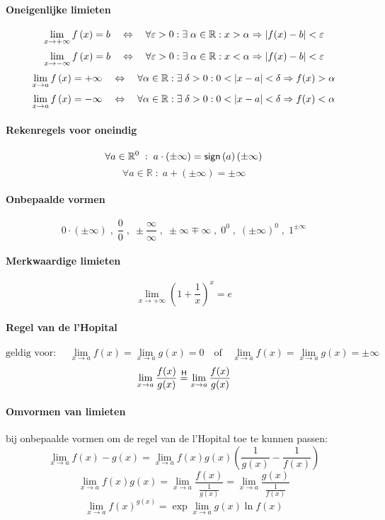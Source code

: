 \paragraph{Oneigenlijke limieten}
\[
  \lim_{x \to + \infty} f\left(x\right) = b 
  \quad \Leftrightarrow \quad
  \forall \varepsilon > 0 : \exists\; \alpha \in \mathbb{R} : x > \alpha
                            \Rightarrow \abs{f(x) - b} < \varepsilon
\]
\[
  \lim_{x \to - \infty} f\left(x\right) = b 
  \quad \Leftrightarrow \quad
  \forall \varepsilon > 0 : \exists\; \alpha \in \mathbb{R} : x < \alpha
                            \Rightarrow \abs{f(x) - b} < \varepsilon
\]
\[
  \lim_{x \to a} f\left(x\right) = + \infty 
  \quad \Leftrightarrow \quad
  \forall \alpha \in \mathbb{R} : \exists\; \delta > 0 : 0 < \abs{x-a} < \delta
                                  \Rightarrow f(x) > \alpha
\]
\[
  \lim_{x \to a} f\left(x\right) = - \infty 
  \quad \Leftrightarrow \quad
  \forall \alpha \in \mathbb{R} : \exists\; \delta > 0 : 0 < \abs{x-a} < \delta
                                  \Rightarrow f(x) < \alpha
\]
\paragraph{Rekenregels voor oneindig}
\[
  \forall a \in \mathbb{R}^0\; : \; 
  a \cdot \left(\pm \infty\right) = \textsf{sign}\left( a \right) \left(\pm \infty \right)
\]
\[
  \forall a \in \mathbb{R} \; : \; 
  a + \left(\pm \infty\right) = \pm \infty
\]
\paragraph{Onbepaalde vormen}
\[
  0 \cdot \left( \pm \infty \right) \;,\;
  \frac{0}{0} \;,\;
  \pm \frac{\infty}{\infty} \;,\;
  \pm \infty \mp \infty \;,\;
  0^0 \;,\;
  \left( \pm \infty \right)^0 \;,\;
  1^{\pm \infty}
\]

\paragraph{Merkwaardige limieten}
\[
  \lim_{x \to +\infty} \left( 1 + \frac{1}{x} \right)^x = e
\]

\paragraph{Regel van de l'Hopital}
\[
  \mbox{geldig voor: } \quad \lim_{x \to a} f(x) = \lim_{x \to a} g(x) = 0 \quad \mbox{of} \quad  \lim_{x \to a} f(x) = \lim_{x \to a} g(x) = \pm \infty
\]
\[
  \lim_{x \to a} \frac{f(x)}{g(x)}
  \stackrel{\textsf{H}}{=}
  \lim_{x \to a} \frac{f(x)}{g(x)}
\]

\paragraph{Omvormen van limieten} bij onbepaalde vormen om de regel van de l'Hopital toe te kunnen passen:
\[
  \lim_{x \to a} f(x) - g(x) = \lim_{x \to a} f(x)g(x)\left(\frac{1}{g(x)} - \frac{1}{f(x)}\right) 
\]
\[
  \lim_{x \to a} f(x)g(x) = \lim_{x \to a} \frac{f(x)}{\frac{1}{g(x)}}
                          = \lim_{x \to a} \frac{g(x)}{\frac{1}{f(x)}}
\]
\[
  \lim_{x \to a} f(x)^{g(x)} = \exp \lim_{x \to a} g(x) \ln f(x)
\]